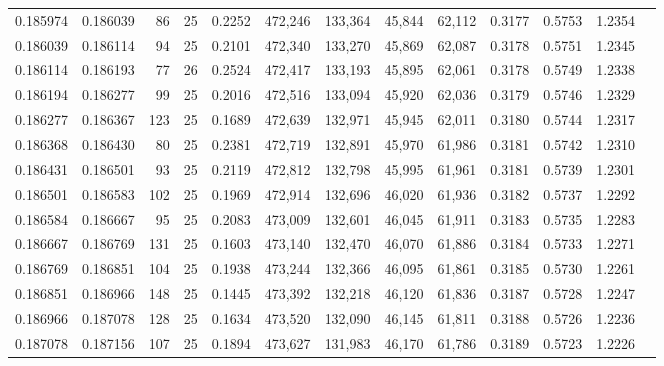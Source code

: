 \begin{tabular}{rrrrrrrrrrrrr}
0.185974 & 0.186039 &    86 &  25 &                                     0.2252 & 472,246 & 133,364 &  45,844 &  62,112 & 0.3177 & 0.5753 & 1.2354 \\
0.186039 & 0.186114 &    94 &  25 &                                     0.2101 & 472,340 & 133,270 &  45,869 &  62,087 & 0.3178 & 0.5751 & 1.2345 \\
0.186114 & 0.186193 &    77 &  26 &                                     0.2524 & 472,417 & 133,193 &  45,895 &  62,061 & 0.3178 & 0.5749 & 1.2338 \\
0.186194 & 0.186277 &    99 &  25 &                                     0.2016 & 472,516 & 133,094 &  45,920 &  62,036 & 0.3179 & 0.5746 & 1.2329 \\
0.186277 & 0.186367 &   123 &  25 &                                     0.1689 & 472,639 & 132,971 &  45,945 &  62,011 & 0.3180 & 0.5744 & 1.2317 \\
0.186368 & 0.186430 &    80 &  25 &                                     0.2381 & 472,719 & 132,891 &  45,970 &  61,986 & 0.3181 & 0.5742 & 1.2310 \\
0.186431 & 0.186501 &    93 &  25 &                                     0.2119 & 472,812 & 132,798 &  45,995 &  61,961 & 0.3181 & 0.5739 & 1.2301 \\
0.186501 & 0.186583 &   102 &  25 &                                     0.1969 & 472,914 & 132,696 &  46,020 &  61,936 & 0.3182 & 0.5737 & 1.2292 \\
0.186584 & 0.186667 &    95 &  25 &                                     0.2083 & 473,009 & 132,601 &  46,045 &  61,911 & 0.3183 & 0.5735 & 1.2283 \\
0.186667 & 0.186769 &   131 &  25 &                                     0.1603 & 473,140 & 132,470 &  46,070 &  61,886 & 0.3184 & 0.5733 & 1.2271 \\
0.186769 & 0.186851 &   104 &  25 &                                     0.1938 & 473,244 & 132,366 &  46,095 &  61,861 & 0.3185 & 0.5730 & 1.2261 \\
0.186851 & 0.186966 &   148 &  25 &                                     0.1445 & 473,392 & 132,218 &  46,120 &  61,836 & 0.3187 & 0.5728 & 1.2247 \\
0.186966 & 0.187078 &   128 &  25 &                                     0.1634 & 473,520 & 132,090 &  46,145 &  61,811 & 0.3188 & 0.5726 & 1.2236 \\
0.187078 & 0.187156 &   107 &  25 &                                     0.1894 & 473,627 & 131,983 &  46,170 &  61,786 & 0.3189 & 0.5723 & 1.2226 \\

\end{tabular}

